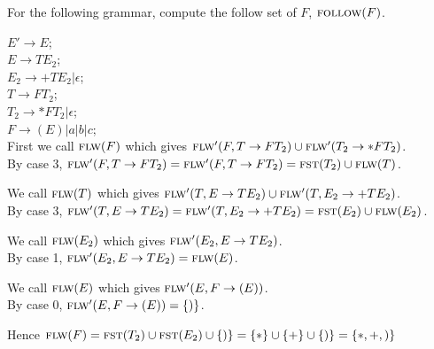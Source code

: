 \frmrule

\begin{example}
For the following grammar, compute the follow set of $F$, $\textsc{follow}(F)$.

$E' \rightarrow E$;\\
$E \rightarrow T E_2$;\\
$E_2 \rightarrow + T E_2 | \epsilon$;\\
$T \rightarrow F T_2$;\\
$T_2 \rightarrow * F T_2 | \epsilon$;\\
$F \rightarrow ( E ) | a | b | c$; \\

First we call $\textsc{flw}(F)$ which gives $\textsc{flw}'(F,T \rightarrow FT_2) \cup \textsc{flw}'(T_2 \rightarrow *FT_2)$.\\
By case 3, $\textsc{flw}'(F,T \rightarrow FT_2) = \textsc{flw}'(F,T \rightarrow FT_2) = \textsc{fst}(T_2) \cup \textsc{flw}(T)$. 

We call $\textsc{flw}(T)$ which gives $\textsc{flw}'(T,E \rightarrow TE_2) \cup \textsc{flw}'(T, E_2 \rightarrow +TE_2)$.\\
By case 3, $\textsc{flw}'(T,E \rightarrow TE_2) = \textsc{flw}'(T, E_2 \rightarrow +TE_2) = \textsc{fst}(E_2) \cup \textsc{flw}(E_2) $.

We call $\textsc{flw}(E_2)$ which gives $\textsc{flw}'(E_2,E \rightarrow TE_2)$.\\
By case 1, $\textsc{flw}'(E_2,E \rightarrow TE_2) = \textsc{flw}(E)$.

We call $\textsc{flw}(E)$ which gives $\textsc{flw}'(E,F \rightarrow (E))$.\\
By case 0, $\textsc{flw}'(E,F \rightarrow (E)) = \{)\}$. 

Hence $\textsc{flw}(F) =  \textsc{fst}(T_2) \cup \textsc{fst}(E_2) \cup \{)\} = \{*\} \cup \{ + \} \cup \{)\} = \{*,+,)\}$
\end{example}

\frmrule

